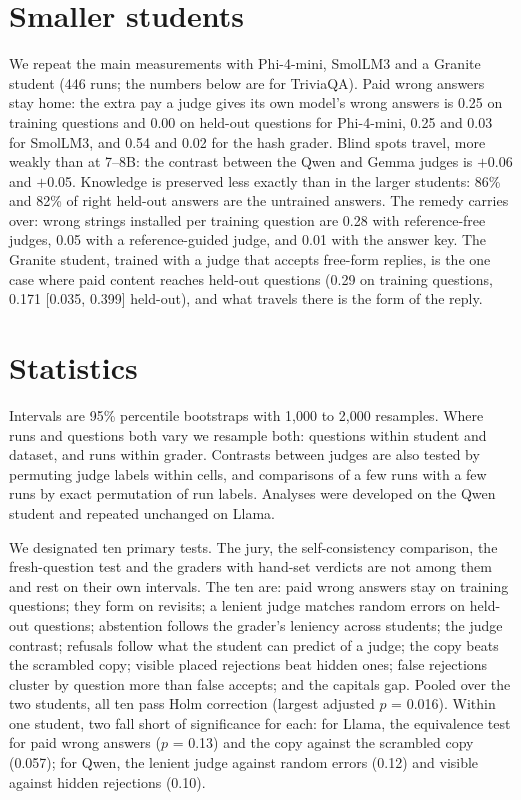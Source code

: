 \documentclass[11pt,a4paper,twocolumn]{article}
\begin{document}
\section{Smaller students}
\label{app:small}

We repeat the main measurements with Phi-4-mini, SmolLM3 and a Granite student (446 runs; the numbers below are for TriviaQA). Paid wrong answers stay home: the extra pay a judge gives its own model's wrong answers is 0.25 on training questions and 0.00 on held-out questions for Phi-4-mini, 0.25 and 0.03 for SmolLM3, and 0.54 and 0.02 for the hash grader. Blind spots travel, more weakly than at 7--8B: the contrast between the Qwen and Gemma judges is $+$0.06 and $+$0.05. Knowledge is preserved less exactly than in the larger students: 86\% and 82\% of right held-out answers are the untrained answers. The remedy carries over: wrong strings installed per training question are 0.28 with reference-free judges, 0.05 with a reference-guided judge, and 0.01 with the answer key. The Granite student, trained with a judge that accepts free-form replies, is the one case where paid content reaches held-out questions (0.29 on training questions, 0.171 [0.035, 0.399] held-out), and what travels there is the form of the reply.

\section{Statistics}
\label{app:stats}

Intervals are 95\% percentile bootstraps with 1{,}000 to 2{,}000 resamples. Where runs and questions both vary we resample both: questions within student and dataset, and runs within grader. Contrasts between judges are also tested by permuting judge labels within cells, and comparisons of a few runs with a few runs by exact permutation of run labels. Analyses were developed on the Qwen student and repeated unchanged on Llama.

We designated ten primary tests. The jury, the self-consistency comparison, the fresh-question test and the graders with hand-set verdicts are not among them and rest on their own intervals. The ten are: paid wrong answers stay on training questions; they form on revisits; a lenient judge matches random errors on held-out questions; abstention follows the grader's leniency across students; the judge contrast; refusals follow what the student can predict of a judge; the copy beats the scrambled copy; visible placed rejections beat hidden ones; false rejections cluster by question more than false accepts; and the capitals gap. Pooled over the two students, all ten pass Holm correction (largest adjusted $p$ = 0.016). Within one student, two fall short of significance for each: for Llama, the equivalence test for paid wrong answers ($p$ = 0.13) and the copy against the scrambled copy (0.057); for Qwen, the lenient judge against random errors (0.12) and visible against hidden rejections (0.10).
\end{document}
